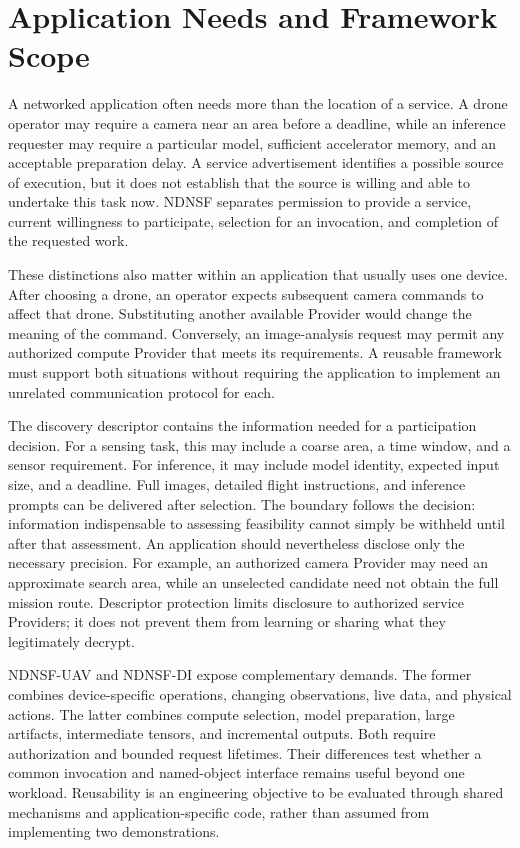 \section{Application Needs and Framework Scope}
A networked application often needs more than the location of a service. A drone operator may require a camera near an area before a deadline, while an inference requester may require a particular model, sufficient accelerator memory, and an acceptable preparation delay. A service advertisement identifies a possible source of execution, but it does not establish that the source is willing and able to undertake this task now. NDNSF separates permission to provide a service, current willingness to participate, selection for an invocation, and completion of the requested work.

These distinctions also matter within an application that usually uses one device. After choosing a drone, an operator expects subsequent camera commands to affect that drone. Substituting another available Provider would change the meaning of the command. Conversely, an image-analysis request may permit any authorized compute Provider that meets its requirements. A reusable framework must support both situations without requiring the application to implement an unrelated communication protocol for each.

The discovery descriptor contains the information needed for a participation decision. For a sensing task, this may include a coarse area, a time window, and a sensor requirement. For inference, it may include model identity, expected input size, and a deadline. Full images, detailed flight instructions, and inference prompts can be delivered after selection. The boundary follows the decision: information indispensable to assessing feasibility cannot simply be withheld until after that assessment. An application should nevertheless disclose only the necessary precision. For example, an authorized camera Provider may need an approximate search area, while an unselected candidate need not obtain the full mission route. Descriptor protection limits disclosure to authorized service Providers; it does not prevent them from learning or sharing what they legitimately decrypt.

NDNSF-UAV and NDNSF-DI expose complementary demands. The former combines device-specific operations, changing observations, live data, and physical actions. The latter combines compute selection, model preparation, large artifacts, intermediate tensors, and incremental outputs. Both require authorization and bounded request lifetimes. Their differences test whether a common invocation and named-object interface remains useful beyond one workload. Reusability is an engineering objective to be evaluated through shared mechanisms and application-specific code, rather than assumed from implementing two demonstrations.

